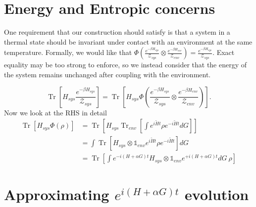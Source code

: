 \documentclass{article}
\newcommand{\parens}[1]{\left( #1 \right)}
\newcommand{\brackets}[1]{\left[ #1 \right]}
\newcommand{\openone}{\mathds{1}}
\DeclareMathOperator{\Tr}{Tr}
\newcommand{\trace}[1]{\Tr \brackets{ #1 }}
\newcommand{\partrace}[2]{\Tr_{#1} \brackets{ #2 }}
\newcommand{\partfun}{\mathcal{Z}}
\begin{document}
\section{Energy and Entropic concerns}
One requirement that our construction should satisfy is that a system in a thermal state should be invariant under contact with an environment at the same temperature. Formally, we would like that $\Phi \parens{\frac{e^{-\beta H_{sys}}}{\partfun_{sys}} \otimes \frac{e^{- \beta H_{env}}}{\partfun_{env}}} = \frac{e^{-\beta H_{sys}}}{\partfun_{sys}}$. Exact equality may be too strong to enforce, so we instead consider that the energy of the system remains unchanged after coupling with the environment. 

\begin{equation}
    \trace{H_{sys} \frac{e^{-\beta H_{sys}}}{\partfun_{sys}}} = \trace{H_{sys} \Phi \parens{\frac{e^{-\beta H_{sys}}}{\partfun_{sys}} \otimes \frac{e^{- \beta H_{env}}}{\partfun_{env}}}}.
\end{equation}
Now we look at the RHS in detail
\begin{align}
    \trace{H_{sys} \Phi \parens{\rho} } &= \trace{ H_{sys} \partrace{env}{\int e^{i \widetilde{H} t} \rho e^{-i \widetilde{H} t} dG}} \\
    &= \int \trace{H_{sys} \otimes \openone_{env} e^{i \widetilde{H} t} \rho e^{-i \widetilde{H} t} } dG \\
    &=  \trace{\int e^{- i (H + \alpha G) t} H_{sys} \otimes \openone_{env} e^{+ i (H + \alpha G) t} dG ~ \rho }
\end{align}

 

\section{Approximating $e^{i (H + \alpha G) t}$ evolution}



\end{document}
